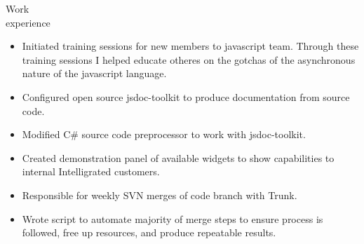 \begin{category}{Work \\experience}
\begin{itemize}
\item Initiated training sessions for new members to javascript team. Through these training sessions I helped educate otheres on the gotchas of the asynchronous nature of the javascript language.%
\item Configured open source jsdoc-toolkit to produce documentation from source code.
\item Modified C\# source code preprocessor to work with jsdoc-toolkit. %
\item Created demonstration panel of available widgets to show capabilities to internal Intelligrated customers. 
\item Responsible for weekly SVN merges of code branch with Trunk. %
\item Wrote script to automate majority of merge steps to ensure process is followed, free up resources, and produce repeatable results. %




\end{itemize}
\end{category}
